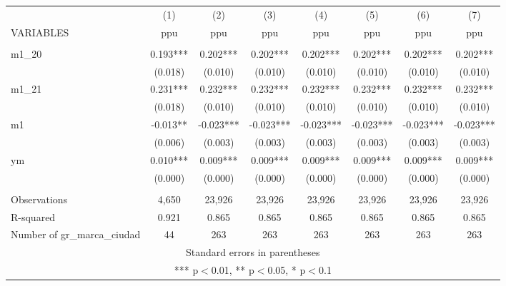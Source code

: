 \begin{tabular}{lccccccc} \hline
 & (1) & (2) & (3) & (4) & (5) & (6) & (7) \\
VARIABLES & ppu & ppu & ppu & ppu & ppu & ppu & ppu \\ \hline
 &  &  &  &  &  &  &  \\
m1\_20 & 0.193*** & 0.202*** & 0.202*** & 0.202*** & 0.202*** & 0.202*** & 0.202*** \\
 & (0.018) & (0.010) & (0.010) & (0.010) & (0.010) & (0.010) & (0.010) \\
m1\_21 & 0.231*** & 0.232*** & 0.232*** & 0.232*** & 0.232*** & 0.232*** & 0.232*** \\
 & (0.018) & (0.010) & (0.010) & (0.010) & (0.010) & (0.010) & (0.010) \\
m1 & -0.013** & -0.023*** & -0.023*** & -0.023*** & -0.023*** & -0.023*** & -0.023*** \\
 & (0.006) & (0.003) & (0.003) & (0.003) & (0.003) & (0.003) & (0.003) \\
ym & 0.010*** & 0.009*** & 0.009*** & 0.009*** & 0.009*** & 0.009*** & 0.009*** \\
 & (0.000) & (0.000) & (0.000) & (0.000) & (0.000) & (0.000) & (0.000) \\
 &  &  &  &  &  &  &  \\
Observations & 4,650 & 23,926 & 23,926 & 23,926 & 23,926 & 23,926 & 23,926 \\
R-squared & 0.921 & 0.865 & 0.865 & 0.865 & 0.865 & 0.865 & 0.865 \\
 Number of gr\_marca\_ciudad & 44 & 263 & 263 & 263 & 263 & 263 & 263 \\ \hline
\multicolumn{8}{c}{ Standard errors in parentheses} \\
\multicolumn{8}{c}{ *** p$<$0.01, ** p$<$0.05, * p$<$0.1} \\
\end{tabular}
